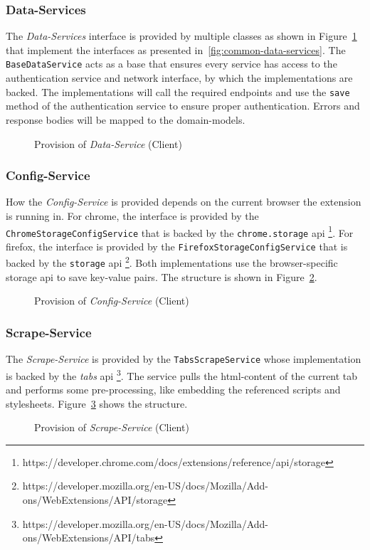 \subsubsection{Data-Services}
The \textit{Data-Services} interface is provided by multiple classes as shown in Figure~\ref{fig:common-data-services-p} that implement the interfaces as presented in~\ref{fig:common-data-services}. \newline
The \texttt{BaseDataService} acts as a base that ensures every service has access to the authentication service and network interface, by which the implementations are backed.
The implementations will call the required endpoints and use the \texttt{save} method of the authentication service to ensure proper authentication.
Errors and response bodies will be mapped to the domain-models.

\begin{figure}
    \centering
    \caption{Provision of \textit{Data-Service} (Client)}
    \label{fig:common-data-services-p}
\end{figure}

\subsubsection{Config-Service}
How the \textit{Config-Service} is provided depends on the current browser the extension is running in.
For chrome, the interface is provided by the \texttt{ChromeStorageConfigService} that is backed by the \texttt{chrome.storage} api \footnote{https://developer.chrome.com/docs/extensions/reference/api/storage}.
For firefox, the interface is provided by the \texttt{FirefoxStorageConfigService} that is backed by the \texttt{storage} api \footnote{https://developer.mozilla.org/en-US/docs/Mozilla/Add-ons/WebExtensions/API/storage}. \newline
Both implementations use the browser-specific storage api to save key-value pairs.
The structure is shown in Figure~\ref{fig:active-config-service-p}.

\begin{figure}
    \centering
    \caption{Provision of \textit{Config-Service} (Client)}
    \label{fig:active-config-service-p}
\end{figure}

\subsubsection{Scrape-Service}
The \textit{Scrape-Service} is provided by the \texttt{TabsScrapeService} whose implementation is backed by the \textit{tabs} api \footnote{https://developer.mozilla.org/en-US/docs/Mozilla/Add-ons/WebExtensions/API/tabs}.
The service pulls the html-content of the current tab and performs some pre-processing, like embedding the referenced scripts and stylesheets.
Figure~\ref{fig:active-scrape-service-p} shows the structure.

\begin{figure}
    \centering
    \caption{Provision of \textit{Scrape-Service} (Client)}
    \label{fig:active-scrape-service-p}
\end{figure}

